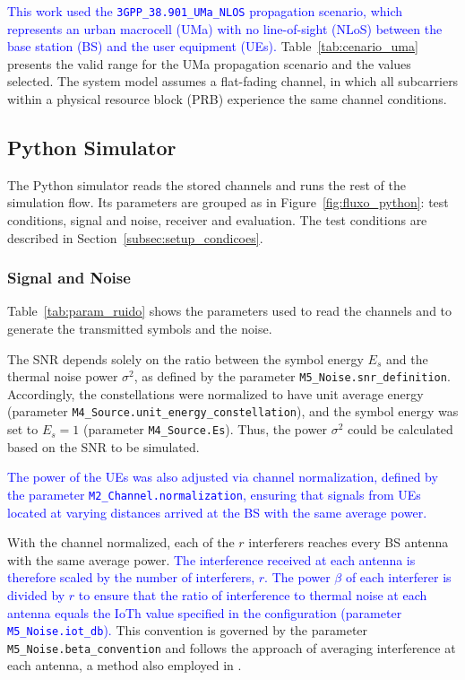 \textcolor{blue}{This work used the \texttt{3GPP\_\allowbreak{}38.901\_\allowbreak{}UMa\_\allowbreak{}NLOS} propagation scenario, which represents an urban macrocell (UMa) with no line-of-sight (NLoS) between the base station (BS) and the user equipment (UEs).} Table~\ref{tab:cenario_uma} presents the valid range for the UMa propagation scenario and the values selected. The system model assumes a flat-fading channel, in which all subcarriers within a physical resource block (PRB) experience the same channel conditions.

\subsection{Python Simulator}\label{subsec:setup_python}

The Python simulator reads the stored channels and runs the rest of the simulation flow. Its parameters are grouped as in Figure~\ref{fig:fluxo_python}: test conditions, signal and noise, receiver and evaluation. The test conditions are described in Section~\ref{subsec:setup_condicoes}.

\subsubsection{Signal and Noise}\label{subsec:setup_ruido}

Table~\ref{tab:param_ruido} shows the parameters used to read the channels and to generate the transmitted symbols and the noise.

The SNR depends solely on the ratio between the symbol energy $E_s$ and the thermal noise power $\sigma^2$, as defined by the parameter \texttt{M5\_\allowbreak{}Noise.\allowbreak{}snr\_\allowbreak{}definition}. Accordingly, the constellations were normalized to have unit average energy (parameter \texttt{M4\_\allowbreak{}Source.\allowbreak{}unit\_\allowbreak{}energy\_\allowbreak{}constellation}), and the symbol energy was set to $E_s = 1$ (parameter \texttt{M4\_\allowbreak{}Source.\allowbreak{}Es}). Thus, the power $\sigma^2$ could be calculated based on the SNR to be simulated.

\textcolor{blue}{The power of the UEs was also adjusted via channel normalization, defined by the parameter \texttt{M2\_\allowbreak{}Channel.\allowbreak{}normalization}, ensuring that signals from UEs located at varying distances arrived at the BS with the same average power.}

With the channel normalized, each of the $r$ interferers reaches every BS antenna with the same average power. \textcolor{blue}{The interference received at each antenna is therefore scaled by the number of interferers, $r$.} \textcolor{blue}{The power $\beta$ of each interferer is divided by $r$ to ensure that the ratio of interference to thermal noise at each antenna equals the IoTh value specified in the configuration (parameter \texttt{M5\_\allowbreak{}Noise.\allowbreak{}iot\_\allowbreak{}db}).} This convention is governed by the parameter \texttt{M5\_\allowbreak{}Noise.\allowbreak{}beta\_\allowbreak{}convention} and follows the approach of averaging interference at each antenna, a method also employed in \cite{tomasin-interference}.

